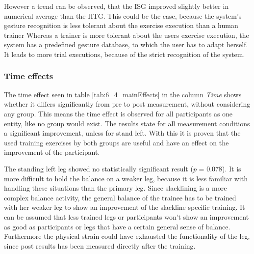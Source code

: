 
However a trend can be observed, that the ISG improved slightly better in numerical average than the HTG.
This could be the case, because the system's gesture recognition is less tolerant about the exercise execution than a human trainer
Whereas a trainer is more tolerant about the users exercise execution, the system has a predefined gesture database, to which the user has to adapt herself.
It leads to more trial executions, because of the strict recognition of the system.

\subsubsection{Time effects}
The time effect seen in table \ref{tab:6_4_mainEffects} in the column \textit{Time} shows whether it differs significantly from pre to post measurement, without considering any group.
This means the time effect is observed for all participants as one entity, like no group would exist.
The results state for all measurement conditions a significant improvement, unless for stand left.
With this it is proven that the used training exercises by both groups are useful and have an effect on the improvement of the participant.

The standing left leg showed no statistically significant result ($p$ = 0.078).
It is more difficult to hold the balance on a weaker leg, because it is less familiar with handling these situations than the primary leg.
Since slacklining is a more complex balance activity, the general balance of the trainee has to be trained with her weaker leg to show an improvement of the slackline specific training.
It can be assumed that less trained legs or participants won't show an improvement as good as participants or legs that have a certain general sense of balance.
Furthermore the physical strain could have exhausted the functionality of the leg, since post results has been measured directly after the training.

